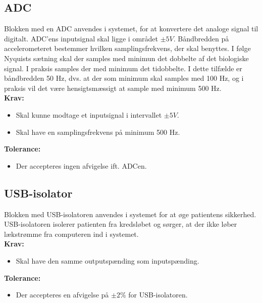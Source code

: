 \subsection{ADC}
Blokken med en ADC anvendes i systemet, for at konvertere det analoge signal til digitalt. %
ADC'ens inputsignal skal ligge i området $\pm 5 V$. Båndbredden på accelerometeret bestemmer hvilken samplingsfrekvens, der skal benyttes. I følge Nyquists sætning skal der samples med minimun det dobbelte af det biologiske signal. I praksis samples der med minimum det tidobbelte. I dette tilfælde er båndbredden 50 Hz, dvs. at der som minimum skal samples med 100 Hz, og i praksis vil det være hensigtsmæssigt at sample med minimum 500 Hz. \\
\textbf{Krav:}
\begin{itemize}
	\item Skal kunne modtage et inputsignal i intervallet $\pm 5 V$.
	\item Skal have en samplingsfrekvens på minimum 500 Hz.
\end{itemize}
\textbf{Tolerance:}
\begin{itemize}
	\item Der accepteres ingen afvigelse ift. ADCen.
\end{itemize}
\subsection{USB-isolator}\label{kravspecifikationer_USB}
Blokken med USB-isolatoren anvendes i systemet for at øge patientens sikkerhed. USB-isolatoren isolerer patienten fra kredsløbet og sørger, at der ikke løber lækstrømme fra computeren ind i systemet.\\
\textbf{Krav:}
\begin{itemize}
	\item Skal have den samme outputspænding som inputspænding. 
\end{itemize}
\textbf{Tolerance:}
\begin{itemize}
	\item Der accepteres en afvigelse på $\pm 2 \%$ for USB-isolatoren. 
\end{itemize}
